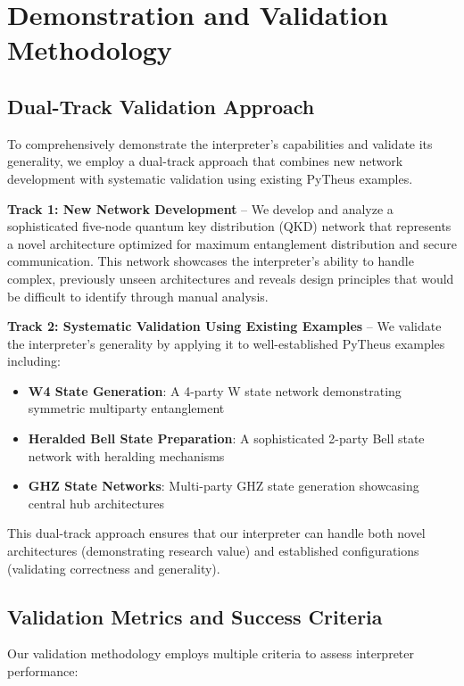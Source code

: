 \documentclass[11pt,a4paper]{article}
\begin{document}
\section{Demonstration and Validation Methodology}

\subsection{Dual-Track Validation Approach}

To comprehensively demonstrate the interpreter's capabilities and validate its generality, we employ a dual-track approach that combines new network development with systematic validation using existing PyTheus examples.

\textbf{Track 1: New Network Development} -- We develop and analyze a sophisticated five-node quantum key distribution (QKD) network that represents a novel architecture optimized for maximum entanglement distribution and secure communication. This network showcases the interpreter's ability to handle complex, previously unseen architectures and reveals design principles that would be difficult to identify through manual analysis.

\textbf{Track 2: Systematic Validation Using Existing Examples} -- We validate the interpreter's generality by applying it to well-established PyTheus examples including:
\begin{itemize}
\item \textbf{W4 State Generation}: A 4-party W state network demonstrating symmetric multiparty entanglement
\item \textbf{Heralded Bell State Preparation}: A sophisticated 2-party Bell state network with heralding mechanisms
\item \textbf{GHZ State Networks}: Multi-party GHZ state generation showcasing central hub architectures
\end{itemize}

This dual-track approach ensures that our interpreter can handle both novel architectures (demonstrating research value) and established configurations (validating correctness and generality).

\subsection{Validation Metrics and Success Criteria}

Our validation methodology employs multiple criteria to assess interpreter performance:
\end{document}
